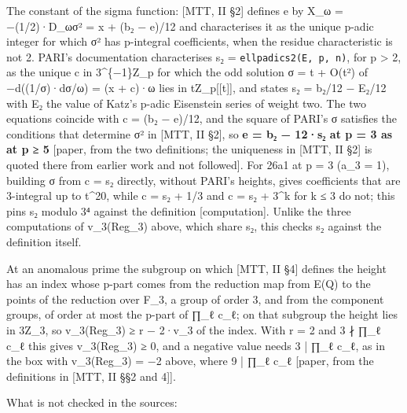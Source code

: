 \documentclass[11pt,a4paper]{article}
\theoremstyle{named}
\begin{document}
The constant of the sigma function: [MTT, II §2] defines e by X\_ω = −(1/2)·D\_ωσ² = x + (b₂ − e)/12 and characterises it as the unique p-adic integer for which σ² has p-integral coefficients, when the residue characteristic is not 2. PARI's documentation characterises s₂ = \texttt{ellpadics2(E,\ \allowbreak{}p,\ \allowbreak{}n)}, for p \textgreater{} 2, as the unique c in 3\textasciicircum{}\{−1\}Z\_p for which the odd solution σ = t + O(t²) of −d((1/σ)·dσ/ω) = (x + c)·ω lies in tZ\_p[[t]], and states s₂ = b₂/12 − E₂/12 with E₂ the value of Katz's p-adic Eisenstein series of weight two. The two equations coincide with c = (b₂ − e)/12, and the square of PARI's σ satisfies the conditions that determine σ² in [MTT, II §2], so \textbf{e = b₂ − 12·s₂ at p = 3 as at p ≥ 5} [paper, from the two definitions; the uniqueness in [MTT, II §2] is quoted there from earlier work and not followed]. For 26a1 at p = 3 (a\_3 = 1), building σ from c = s₂ directly, without PARI's heights, gives coefficients that are 3-integral up to t\textasciicircum{}20, while c = s₂ + 1/3 and c = s₂ + 3\textasciicircum{}k for k ≤ 3 do not; this pins s₂ modulo 3⁴ against the definition [computation]. Unlike the three computations of v\_3(Reg\_3) above, which share s₂, this checks s₂ against the definition itself.

At an anomalous prime the subgroup on which [MTT, II §4] defines the height has an index whose p-part comes from the reduction map from E(Q) to the points of the reduction over F\_3, a group of order 3, and from the component groups, of order at most the p-part of ∏\_ℓ c\_ℓ; on that subgroup the height lies in 3Z\_3, so v\_3(Reg\_3) ≥ r − 2·v\_3 of the index. With r = 2 and 3 ∤ ∏\_ℓ c\_ℓ this gives v\_3(Reg\_3) ≥ 0, and a negative value needs 3 | ∏\_ℓ c\_ℓ, as in the box with v\_3(Reg\_3) = −2 above, where 9 | ∏\_ℓ c\_ℓ [paper, from the definitions in [MTT, II §§2 and 4]].

What is not checked in the sources:
\end{document}
